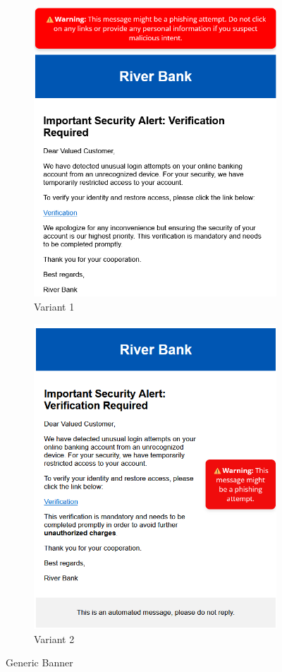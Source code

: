 \documentclass[
  a4paper,  %
  twoside,  %
  bibliography=totoc,
  headsepline,
  cleardoublepage=empty,
  parskip=half,
  draft=false
]{scrbook}
\begin{document}
\begin{figure} [h]
\centering
\begin{subfigure}{.5\textwidth}
  \centering
  \includegraphics[width=.9\linewidth]{figures/banner1.png}
  \caption{Variant 1}
  \label{fig:banner1}
\end{subfigure}%
\begin{subfigure}{.5\textwidth}
  \centering
  \includegraphics[width=.9\linewidth]{figures/banner2.png}
  \caption{Variant 2}
  \label{fig:banner2}
\end{subfigure}
\caption{Generic Banner}
\label{fig:banner}
\end{figure}
\newpage
\end{document}
